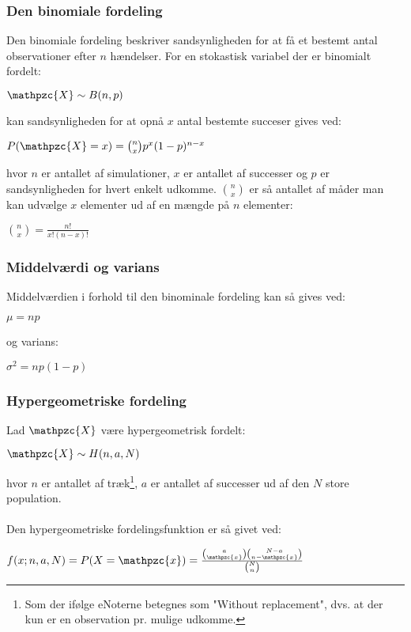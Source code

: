 \documentclass{article}
\newcommand{\mellemrum}{\vspace{2 ex}}
\newcommand{\cent}[1]{ \mellemrum \begin{center} #1\end{center} \mellemrum }
\newcommand{\script}[1]{\mathpzc{#1}}
\begin{document}
	\subsubsection{Den binomiale fordeling}
	
	Den binomiale fordeling beskriver sandsynligheden for at få et bestemt antal observationer efter $n$ hændelser. For en stokastisk variabel der er binomialt fordelt:
	
	\cent{$ \script{X} \sim B(n,p) $}
	
	kan sandsynligheden for at opnå $x$ antal bestemte succeser gives ved:
	
	\cent{$ P(\script{X} = x) = \binom{n}{x} p^x (1-p)^{n-x} $}
	
	hvor $n$ er antallet af simulationer, $x$ er antallet af successer og $p$ er sandsynligheden for hvert enkelt udkomme. $\binom{n}{x}$ er så antallet af måder man kan udvælge $x$ elementer ud af en mængde på  $n$ elementer:
	
	\cent{$ \binom{n}{x} = \frac{n!}{x!(n-x)!} $}
	
	\subsubsection{Middelværdi og varians}
	
	Middelværdien i forhold til den binominale fordeling kan så gives ved:
	
	\cent{$ \mu = np $}
	
	og varians:
	
	\cent{$ \sigma^2 = np(1-p) $}
	
	
	\subsubsection{Hypergeometriske fordeling}
	
	Lad $\script{X}$ være hypergeometrisk fordelt:
	
	\cent{$ \script{X} \sim H(n,a,N) $}
	
	hvor $n$ er antallet af træk\footnote{Som der ifølge eNoterne betegnes som "Without replacement", dvs. at der kun er en observation pr. mulige udkomme.}, $a$ er antallet af successer ud af den $N$ store population.\\
	\\
	Den hypergeometriske fordelingsfunktion er så givet ved:
	
	\cent{$ f(x;n,a,N) = P(X = \script{x}) = \frac{\binom{a}{\script{x}} \binom{N-a}{n-\script{x}}}{\binom{N}{n}} $}
	
\end{document}
